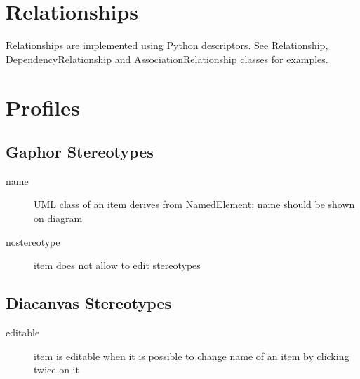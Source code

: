 \documentclass[draft]{book}
\begin{document}




\chapter{Relationships}

Relationships are implemented using Python descriptors. See Relationship,
DependencyRelationship and AssociationRelationship classes for examples.

\chapter{Profiles}

\section{Gaphor Stereotypes}

\begin{description}
\item[name] UML class of an item derives from NamedElement; name
        should be shown on diagram
\item[nostereotype] item does not allow to edit stereotypes
\end{description}

\section{Diacanvas Stereotypes}

\begin{description}
\item[editable] item is editable when it is possible to change name of an
    item by clicking twice on it
\end{description}
\end{document}
